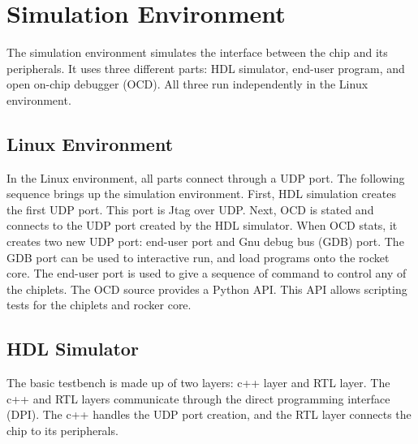 \documentclass[../main.tex]{subfiles}
\begin{document}
\section{Simulation Environment}
The simulation environment simulates the interface between the chip and its peripherals. It uses three different parts: HDL simulator, end-user program, and open on-chip debugger (OCD).  All three run independently in the Linux environment.
\subsection{Linux Environment}
In the Linux environment, all parts connect through a UDP port. The following sequence brings up the simulation environment. First, HDL simulation creates the first UDP port. This port is Jtag over UDP. Next, OCD is stated and connects to the UDP port created by the HDL simulator. When OCD stats, it creates two new UDP port: end-user port and  Gnu debug bus (GDB) port. The GDB port can be used to interactive run, and load programs onto the rocket core. The end-user port is used to give a sequence of command to control any of the chiplets. The OCD source provides a Python API. This API allows scripting tests for the chiplets and rocker core.

\subsection{HDL Simulator}
The basic testbench is made up of two layers: c++ layer and RTL layer. The c++ and RTL layers communicate through the direct programming interface (DPI). The c++ handles the UDP port creation, and the RTL layer connects the chip to its peripherals.  
\end{document}
